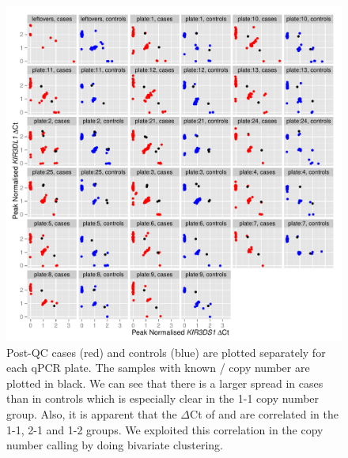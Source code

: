 \begin{figure}[h]
    \centering
        \includegraphics[scale=.9] {figures/Figure-S2.pdf}
        {Post-QC cases (red) and controls (blue) are plotted separately for each qPCR plate.}
        { The samples with known / copy number are plotted in black.
        We can see that there is a larger spread in cases than in controls which is especially clear in the 1-1 copy number group.
        Also, it is apparent that the $\Delta$Ct of  and  are correlated in the 1-1, 2-1 and 1-2 groups.
        We exploited this correlation in the copy number calling by doing bivariate clustering.  }
\end{figure}



